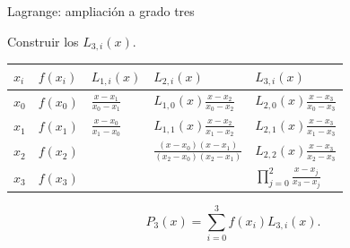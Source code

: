 \documentclass[original_version/main.tex]{subfiles}
\begin{document}
\begin{frame}[t]{Lagrange: ampliación a grado tres}
\par\noindent\begin{minipage}[t][12mm][t]{\textwidth}\small\strut Construir los $L_{3,i}(x)$.\end{minipage}\par\nointerlineskip
\begin{minipage}[t]{\textwidth}\begingroup\scriptsize\setlength{\tabcolsep}{3pt}\begin{center}\begin{tabular}{|C{.065\textwidth}|C{.095\textwidth}|C{.19\textwidth}|C{.25\textwidth}|C{.25\textwidth}|}\hline
\rule[-2mm]{0pt}{6mm}$x_i$&$f(x_i)$&$L_{1,i}(x)$&$L_{2,i}(x)$&$L_{3,i}(x)$\\\hline
\rule[-2.5mm]{0pt}{9mm}$x_0$&$f(x_0)$&$\frac{x-x_1}{x_0-x_1}$&$L_{1,0}(x)\frac{x-x_2}{x_0-x_2}$&$L_{2,0}(x)\frac{x-x_3}{x_0-x_3}$\\\hline
\rule[-2.5mm]{0pt}{9mm}$x_1$&$f(x_1)$&$\frac{x-x_0}{x_1-x_0}$&$L_{1,1}(x)\frac{x-x_2}{x_1-x_2}$&$L_{2,1}(x)\frac{x-x_3}{x_1-x_3}$\\\hline
\rule[-2.5mm]{0pt}{9mm}$x_2$&$f(x_2)$&&$\frac{(x-x_0)(x-x_1)}{(x_2-x_0)(x_2-x_1)}$&$L_{2,2}(x)\frac{x-x_3}{x_2-x_3}$\\\hline
\rule[-2.5mm]{0pt}{9mm}$x_3$&$f(x_3)$&&&$\prod_{j=0}^2\frac{x-x_j}{x_3-x_j}$\\\hline
\end{tabular}\end{center}\endgroup\par
\end{minipage}\par\[P_3(x)=\sum_{i=0}^3f(x_i)L_{3,i}(x).\]
\end{frame}
\end{document}
